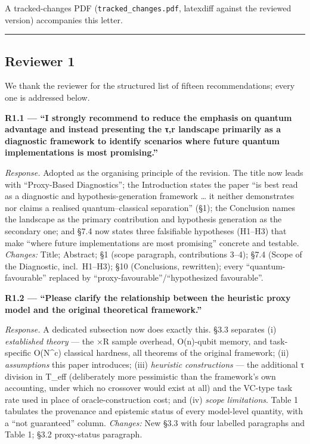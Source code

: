 \documentclass[
  11pt,
]{article}
\begin{document}
A tracked-changes PDF (\texttt{tracked\_changes.pdf}, latexdiff against
the reviewed version) accompanies this letter.

\begin{center}\rule{0.5\linewidth}{0.5pt}\end{center}

\subsection{Reviewer 1}\label{reviewer-1}

We thank the reviewer for the structured list of fifteen
recommendations; every one is addressed below.

\textbf{R1.1 --- ``I strongly recommend to reduce the emphasis on
quantum advantage and instead presenting the τ,r landscape primarily as
a diagnostic framework to identify scenarios where future quantum
implementations is most promising.''}

\emph{Response.} Adopted as the organising principle of the revision.
The title now leads with ``Proxy-Based Diagnostics''; the Introduction
states the paper ``is best read as a diagnostic and
hypothesis-generation framework \ldots{} it neither demonstrates nor
claims a realised quantum--classical separation'' (§1); the Conclusion
names the landscape as the primary contribution and hypothesis
generation as the secondary one; and §7.4 now states three falsifiable
hypotheses (H1--H3) that make ``where future implementations are most
promising'' concrete and testable. \emph{Changes:} Title; Abstract; §1
(scope paragraph, contributions 3--4); §7.4 (Scope of the Diagnostic,
incl.~H1--H3); §10 (Conclusions, rewritten); every
``quantum-favourable'' replaced by ``proxy-favourable''/``hypothesized
favourable''.

\textbf{R1.2 --- ``Please clarify the relationship between the heuristic
proxy model and the original theoretical framework.''}

\emph{Response.} A dedicated subsection now does exactly this. §3.3
separates (i) \emph{established theory} --- the ×R sample overhead,
O(n)-qubit memory, and task-specific O(N\^{}c) classical hardness, all
theorems of the original framework; (ii) \emph{assumptions} this paper
introduces; (iii) \emph{heuristic constructions} --- the additional τ
division in T\_eff (deliberately more pessimistic than the framework's
own accounting, under which no crossover would exist at all) and the
VC-type task rate used in place of oracle-construction cost; and (iv)
\emph{scope limitations}. Table 1 tabulates the provenance and epistemic
status of every model-level quantity, with a ``not guaranteed'' column.
\emph{Changes:} New §3.3 with four labelled paragraphs and Table 1; §3.2
proxy-status paragraph.
\end{document}

